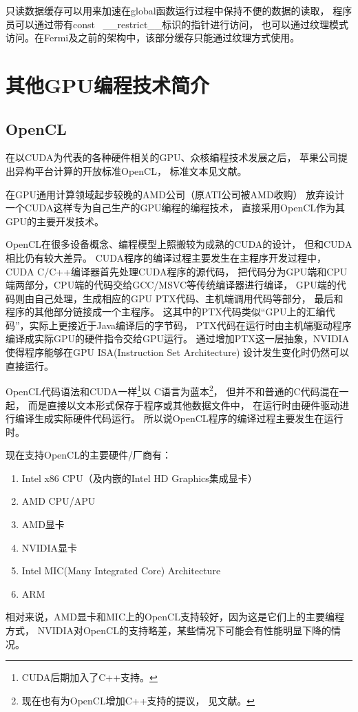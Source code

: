 只读数据缓存可以用来加速在global函数运行过程中保持不便的数据的读取，
程序员可以通过带有const  \_\_restrict\_\_标识的指针进行访问，
也可以通过纹理模式访问。在Fermi及之前的架构中，该部分缓存只能通过纹理方式使用。
\cite{cudadoc-KeplerGK110ArchitectureWhitepaper}



\section{其他GPU编程技术简介}

\subsection{OpenCL}

在以CUDA为代表的各种硬件相关的GPU、众核编程技术发展之后，
苹果公司提出异构平台计算的开放标准OpenCL，
标准文本见文献。

在GPU通用计算领域起步较晚的AMD公司（原ATI公司被AMD收购）
放弃设计一个CUDA这样专为自己生产的GPU编程的编程技术，
直接采用OpenCL作为其GPU的主要开发技术。

OpenCL在很多设备概念、编程模型上照搬较为成熟的CUDA的设计，
但和CUDA相比仍有较大差异。
CUDA程序的编译过程主要发生在主程序开发过程中，CUDA C/C++编译器首先处理CUDA程序的源代码，
把代码分为GPU端和CPU端两部分，CPU端的代码交给GCC/MSVC等传统编译器进行编译，
GPU端的代码则由自己处理，生成相应的GPU PTX代码、主机端调用代码等部分，
最后和程序的其他部分链接成一个主程序。
这其中的PTX代码类似“GPU上的汇编代码”，实际上更接近于Java编译后的字节码，
PTX代码在运行时由主机端驱动程序编译成实际GPU的硬件指令交给GPU运行。
通过增加PTX这一层抽象，NVIDIA使得程序能够在GPU ISA(Instruction Set Architecture)
设计发生变化时仍然可以直接运行。

OpenCL代码语法和CUDA一样\footnote{CUDA后期加入了C++支持。}以
C语言为蓝本\footnote{现在也有为OpenCL增加C++支持的提议，%
见文献。}，
但并不和普通的C代码混在一起，
而是直接以文本形式保存于程序或其他数据文件中，
在运行时由硬件驱动进行编译生成实际硬件代码运行。
所以说OpenCL程序的编译过程主要发生在运行时。

现在支持OpenCL的主要硬件/厂商有：\cite{opencl-conformant-products}
\begin{enumerate}[1)]
\item Intel x86 CPU（及内嵌的Intel HD Graphics集成显卡）
\item AMD CPU/APU
\item AMD显卡
\item NVIDIA显卡
\item Intel MIC(Many Integrated Core) Architecture
\item ARM
\end{enumerate}
相对来说，AMD显卡和MIC上的OpenCL支持较好，因为这是它们上的主要编程方式，
NVIDIA对OpenCL的支持略差，某些情况下可能会有性能明显下降的情况。


